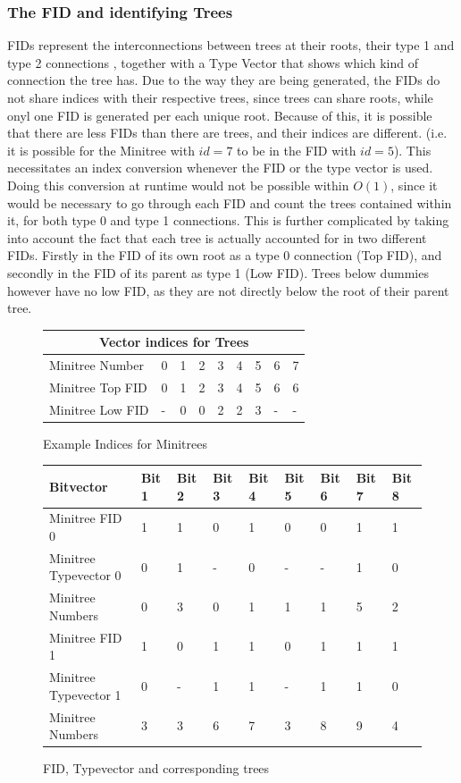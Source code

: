 \documentclass{article}
\begin{document}
\subsubsection{The FID and identifying Trees} \label{The FID and identifying Trees}
FIDs represent the interconnections between trees at their roots, their type 1 and type 2 connections \cite{farzanMunro}, together with a Type Vector that shows which kind of connection the tree has.
Due to the way they are being generated, the FIDs do not share indices with their respective trees, since trees can share roots, while onyl one FID is generated per each unique root. Because of this, it is possible that there are less FIDs than there are trees, and their indices are different. (i.e. it is possible for the Minitree with $id = 7$ to be in the FID with $id = 5$).
This necessitates an index conversion whenever the FID or the type vector is used. Doing this conversion at runtime would not be possible within $O(1)$, since it would be necessary to go through each FID and count the trees contained within it, for both type 0 and type 1 connections.
This is further complicated by taking into account the fact that each tree is actually accounted for in two different FIDs. Firstly in the FID of its own root as a type 0 connection (Top FID), and secondly in the FID of its parent as type 1 (Low FID). Trees below dummies however have no low FID, as they are not directly below the root of their parent tree.\\
\begin{figure}[h]
	\begin{tabular}{ |p{3.5cm}||p{0.5cm}|p{0.5cm}|p{0.5cm}|p{0.5cm}|p{0.5cm}|p{0.5cm}|p{0.5cm}|p{0.5cm}|  }
		 \hline
		 \multicolumn{9}{|c|}{Vector indices for Trees} \\
		 \hline
		 Minitree Number & 0 & 1& 2 & 3 & 4 & 5 & 6 & 7\\
		 Minitree Top FID& 0 & 1 & 2 & 3 & 4 & 5 & 6 & 6\\
		 Minitree Low FID& - & 0 & 0 & 2 & 2 & 3 & - & -\\
		 \hline
	\end{tabular}
\caption{Example Indices for Minitrees}
\label{fid:table1}
\end{figure}
\begin{figure}[h]
	\begin{tabular}{ |p{3.5cm}||p{1cm}|p{1cm}|p{1cm}|p{1cm}|p{1cm}|p{1cm}|p{1cm}|p{1cm}|  }
		 \hline
		 Bitvector & Bit 1 &Bit 2&Bit 3&Bit 4& Bit 5 &Bit 6&Bit 7&Bit 8\\
		 \hline
		 Minitree FID 0 & 1 & 1& 0 & 1 & 0 & 0 & 1 & 1\\
		 Minitree Typevector 0& 0 & 1 & - & 0 & - & - & 1 & 0\\
		 Minitree Numbers & 0 & 3 &  0 & 1 & 1 & 1 & 5 & 2\\
		 \hline
		 Minitree FID 1 & 1 & 0& 1 & 1 & 0 & 1 & 1 & 1\\
		 Minitree Typevector 1& 0 & - & 1 & 1 & - & 1 & 1 & 0\\
		 Minitree Numbers & 3 & 3 &  6 & 7 & 3 & 8 & 9 & 4\\
		 \hline
	\end{tabular}
\caption{FID, Typevector and corresponding trees}
\label{fid:table2}
\end{figure}
\end{document}
